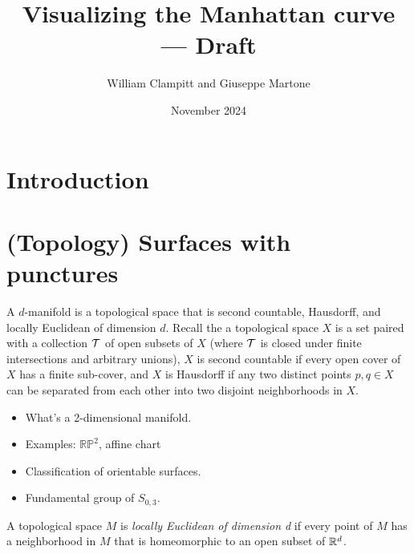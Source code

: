 \documentclass{amsart}
\title{Visualizing the Manhattan curve --- Draft}
\author{William Clampitt and Giuseppe Martone}
\date{November 2024}
\begin{document}
	\maketitle
	\tableofcontents
	
	\section{Introduction}
	\section{(Topology) Surfaces with punctures}
	
	A $d$-manifold is a topological space that is second countable, Hausdorff, and locally Euclidean of dimension $d$. Recall the a topological space $X$ is a set paired with a collection $\mathcal{T}$ of open subsets of $X$ (where $\mathcal{T}$ is closed under finite intersections and arbitrary unions), $X$ is second countable if every open cover of $X$ has a finite sub-cover, and $X$ is Hausdorff if any two distinct points  $p, q \in X$ can be separated from each other into two disjoint neighborhoods in $X$.
	
		\begin{tcolorbox}
		\begin{itemize}
			\item What's a 2-dimensional manifold.
			\item Examples: $\mathbb{RP}^2$, affine chart 
			\item Classification of orientable surfaces.
			\item Fundamental group of $S_{0,3}$.
		\end{itemize}
	\end{tcolorbox}
	
	\begin{definition}
		A topological space $M$ is \emph{locally Euclidean of dimension d} if every point of $M$ has a neighborhood in $M$ that is homeomorphic to an open subset of $\mathbb{R}^d$.
	\end{definition}
	
\end{document}
